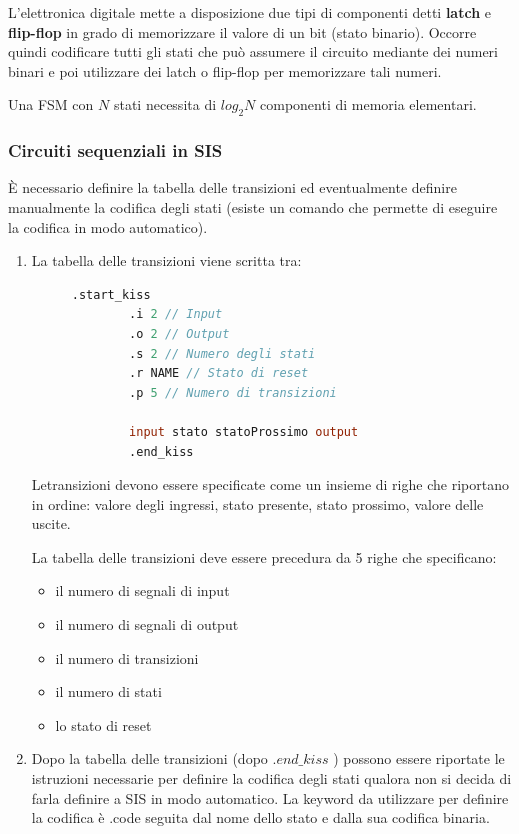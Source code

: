 \documentclass[a4paper]{article}
\theoremstyle{break}
\theoremstyle{break}
\theoremstyle{break}
\theoremstyle{break}
\begin{document}
L’elettronica digitale mette a disposizione due tipi di componenti detti
\textbf{latch} e \textbf{flip-flop} in grado di memorizzare il valore di un bit (stato binario).
Occorre quindi codificare tutti gli stati che può assumere il circuito
mediante dei numeri binari e poi utilizzare dei latch o flip-flop per
memorizzare tali numeri.

Una FSM con \( N \) stati necessita di \( log_2 N \) componenti di memoria elementari.

\subsubsection{Circuiti sequenziali in SIS}
È necessario definire la tabella delle transizioni ed eventualmente definire manualmente la 
codifica degli stati (esiste un comando che permette di eseguire la codifica in modo automatico).
\begin{enumerate}
  \item La tabella delle transizioni viene scritta tra:
    \begin{figure}[H]
      \begin{lstlisting}[language=Verilog]
        .start_kiss
        .i 2 // Input
        .o 2 // Output
        .s 2 // Numero degli stati
        .r NAME // Stato di reset
        .p 5 // Numero di transizioni 

        input stato statoProssimo output
        .end_kiss
      \end{lstlisting}
    \end{figure}
  Letransizioni devono essere specificate come un insieme di righe che
  riportano in ordine: valore degli ingressi, stato presente, stato
  prossimo, valore delle uscite.
  
  La tabella delle transizioni deve essere precedura da 5 righe che specificano:
  \begin{itemize}
    \item il numero di segnali di input
    \item il numero di segnali di output
    \item il numero di transizioni
    \item il numero di stati
    \item lo stato di reset
  \end{itemize}
  \item Dopo la tabella delle transizioni (dopo \( .end\_kiss \) ) possono essere
riportate le istruzioni necessarie per definire la codifica degli stati
qualora non si decida di farla definire a SIS in modo automatico. La
keyword da utilizzare per definire la codifica è .code seguita dal nome
dello stato e dalla sua codifica binaria.
\end{enumerate}
\end{document}

